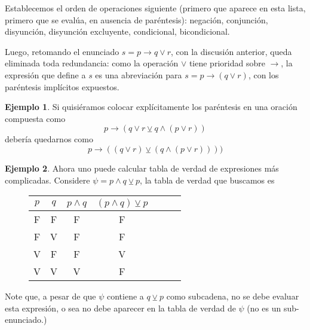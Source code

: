 \documentclass{book}
\theoremstyle{definition}
\newtheorem{ejm}{Ejemplo}[chapter]
\begin{document}
Establecemos el orden de operaciones siguiente (primero que aparece en esta lista, primero que se evalúa, en ausencia de paréntesis): negación, conjunción, disyunción, disyunción excluyente, condicional, bicondicional.

Luego, retomando el enunciado $s=p\rightarrow q \vee r$, con la discusión anterior, queda eliminada toda redundancia: como la operación $\vee$ tiene prioridad sobre $\rightarrow$, la expresión que define a $s$ es una abreviación para $s=p\rightarrow (q \vee r)$, con los paréntesis implícitos expuestos.

\begin{ejm}
	Si quisiéramos colocar explícitamente los paréntesis en una oración compuesta como \[p \rightarrow (q \vee r \veebar q \wedge (p \vee r)) \]
	debería quedarnos como
	\[p \rightarrow ((q \vee r) \veebar (q \wedge (p \vee r)))) \]
\end{ejm}

\begin{ejm}
	Ahora uno puede calcular tabla de verdad de expresiones más complicadas. Considere $\psi = p \wedge q\veebar p$, la tabla de verdad que buscamos es
	\begin{figure}[h]
		\begin{center}\begin{tabular}{|c|c||c|c|c|c|c|}
				\hline 
				$p$& $q$ & $p \wedge q $ & $(p \wedge q) \veebar p$ \\
				\hline \hline
				F & F & F & F \\
				\hline
				F & V & F & F \\
				\hline
				V & F & F & V \\
				\hline
				V & V & V & F \\
				\hline
	\end{tabular}\end{center}\end{figure}
	
	Note que, a pesar de que $\psi$ contiene a $q\veebar p$ como subcadena, no se debe evaluar esta expresión, o sea no debe aparecer en la tabla de verdad de $\psi$ (no es un sub-enunciado.)
\end{ejm}
\end{document}
